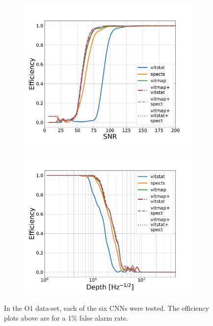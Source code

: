 \begin{figure}
	\begin{subfigure}[h]{0.5\textwidth}
		\includegraphics[width=\columnwidth]{C4_cnn/o1_snr_eff.pdf}
		\caption{\label{machine:results:snr_o1}}
	\end{subfigure}
	\begin{subfigure}[h]{0.5\textwidth}
		\includegraphics[width=\columnwidth]{C4_cnn/o1_depth_eff.pdf}
		\caption{}
		\label{machine:results:depth_o1}
	\end{subfigure}
	\caption[O1 results from SOAP and \gls{CNN} search.]{ In the O1 data-set, each of the six \glspl{CNN} were tested. The efficiency plots above are for a 1\% false alarm rate. }
	\label{machine:results:o1}
	
\end{figure}

